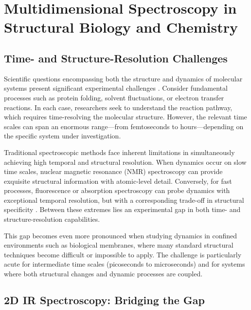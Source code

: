 
\iffalse
	\section{Multidimensional Spectroscopy in Structural Biology and Chemistry}
	\label{sec:multidimensional_applications}

	\subsection{Time- and Structure-Resolution Challenges}
	\label{subsec:time_structure_challenges}

	\noindent Scientific questions encompassing both the structure and dynamics of molecular systems present significant experimental challenges \cite{hammzanni2011conceptsmethods2d}. Consider fundamental processes such as protein folding, solvent fluctuations, or electron transfer reactions. In each case, researchers seek to understand the reaction pathway, which requires time-resolving the molecular structure. However, the relevant time scales can span an enormous range—from femtoseconds to hours—depending on the specific system under investigation.

	\noindent Traditional spectroscopic methods face inherent limitations in simultaneously achieving high temporal and structural resolution. When dynamics occur on slow time scales, nuclear magnetic resonance (NMR) spectroscopy can provide exquisite structural information with atomic-level detail. Conversely, for fast processes, fluorescence or absorption spectroscopy can probe dynamics with exceptional temporal resolution, but with a corresponding trade-off in structural specificity \cite{hammzanni2011conceptsmethods2d}. Between these extremes lies an experimental gap in both time- and structure-resolution capabilities.

	\noindent This gap becomes even more pronounced when studying dynamics in confined environments such as biological membranes, where many standard structural techniques become difficult or impossible to apply. The challenge is particularly acute for intermediate time scales (picoseconds to microseconds) and for systems where both structural changes and dynamic processes are coupled.

	\subsection{2D IR Spectroscopy: Bridging the Gap}
	\label{subsec:2dir_bridging_gap}

